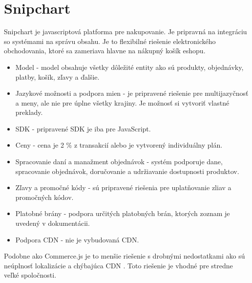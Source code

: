 \documentclass[
  printed, %
  table,   %
  lof,     %
  nolot,     %
  twoside,  
]{fithesis3}
\begin{document}
\section{Snipchart}
Snipchart je javascriptová platforma pre nakupovanie. Je pripravná na integráciu so systémami na správu obsahu. Je to flexibilné riešenie elektronického obchodovania, ktoré sa zameriava hlavne na nákupný košík eshopu.
\begin{itemize}
	\item Model - model  obsahuje všetky dôležité entity ako sú produkty, objednávky, platby, košík, zľavy a ďalšie.
	\item Jazykové možnosti a podpora mien - je pripravené riešenie pre multijazyčnosť a meny, ale nie pre úplne všetky krajiny. Je možnosť si vytvoriť vlastné preklady.
	\item SDK - pripravené SDK je iba pre JavaScript.
	\item Ceny - cena je 2 \% z transakcií alebo je vytvorený individuálny plán.
	\item Spracovanie daní a manažment objednávok - systém podporuje dane, spracovanie objednávok, doručovanie a udržiavanie dostupnosti produktov. 
	\item Zľavy a promočné kódy - sú pripravené riešenia pre uplatňovanie zliav a promočných kódov.
	\item Platobné brány - podpora určitých platobných brán, ktorých zoznam je uvedený v dokumentácii.
	\item Podpora CDN - nie je vybudovaná CDN.
\end{itemize}
Podobne ako Commerce.js je to menšie riešenie s drobnými nedostatkami ako sú neúplnosť lokalizácie a chýbajúca CDN \cite{Snipchart}. Toto riešenie je vhodné pre stredne veľké spoločnosti.
		
\end{document}
